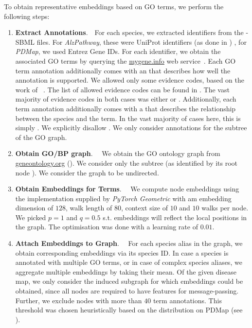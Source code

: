 \documentclass[
	fontsize=10pt, %
	twoside=true, %
	secnumdepth=1, %
  toc=indentunnumbered %
]{kaobook}
\begin{document}


To obtain representative embeddings based on GO terms, we perform the following
steps:
\begin{enumerate}
\item \textbf{Extract Annotations}.~~For each species, we extracted identifiers
  from the -SBML files. For \textit{AlzPathway}, these
  were UniProt identifiers (as done in \cite{ostaszewski_ClusteringApproachesVisual_2018})
  , for \textit{PDMap}, we used Entrez Gene IDs.
%
  For each identifier, we obtain the associated GO terms by querying the
  \href{https://mygene.info/}{mygene.info} web
  service~\cite{xin_HighperformanceWebServices_2016}. Each GO term annotation
  additionally comes with an  that describes how well the
  annotation is supported. We allowed only some evidence codes, based on the
  work of \citeauthor{ruiz_identification_2021}~\cite{ruiz_identification_2021}.
  The list of allowed evidence codes can be found in .
  The vast majority of evidence codes in both cases was either  or
  .
%
  Additionally, each term annotation additionally comes with a 
  that describes the relationship between the species and the term. In the vast
  majority of cases here, this is simply . We explicitly
  disallow .
%
  We only consider annotations for the  subtree of the
  GO graph. 
%
\item \textbf{Obtain GO/BP graph}.~~ We obtain the GO ontology graph from
  \href{http://geneontology.org/docs/download-ontology/}{geneontology.org}
  (). We consider only the  subtree (as
  identified by its root node ). We consider the graph to be undirected.
%
\item \textbf{Obtain Embeddings for Terms}.~~ We compute node embeddings using
  the  implementation supplied by \textit{PyTorch Geometric} with
  am embedding dimension of $128$, walk length of $80$, context size of $10$ and 
  $10$ walks per node. We picked $p=1$ and $q=0.5$ s.t. embeddings will reflect
  the local positions in the graph. The optimisation was done with a learning
  rate of $0.01$.
\item \textbf{Attach Embeddings to Graph}.~~ For each species alias in the
  graph, we obtain corresponding embeddings via its species ID. In case a
  species is annotated with multiple GO terms, or in case of complex species
  aliases, we aggregate multiple embeddings by taking their mean. Of the given
  disease map, we only consider the induced subgraph for which embeddings could
  be obtained, since all nodes are required to have features for
  message-passing. Further, we exclude nodes with more than $40$ term
  annotations. This threshold was chosen heuristically based on the distribution
  on PDMap (see ).
 \end{enumerate}
\end{document}
